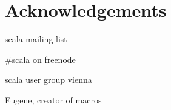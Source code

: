 \documentclass[12pt,oneside,a4paper]{scrbook}
\begin{document}
\chapter{Acknowledgements}
scala mailing list

\#scala on freenode

scala user group vienna

Eugene, creator of macros


\singlespacing

{}
\end{document}
